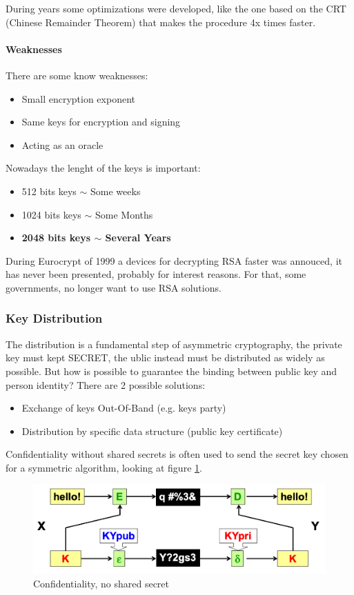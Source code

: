 \documentclass[12pt]{article}
\begin{document}
During years some optimizations were developed, like the one based on the CRT (Chinese Remainder Theorem) that makes the procedure 4x times faster.

\paragraph{Weaknesses} There are some know weaknesses:
\begin{itemize}
  \item Small encryption exponent
  \item Same keys for encryption and signing
  \item Acting as an oracle
\end{itemize}
Nowadays the lenght of the keys is important:
\begin{itemize}
  \item 512 bits keys $\sim$ Some weeks
  \item 1024 bits keys $\sim$ Some Months
  \item \textbf{2048 bits keys $\sim$ Several Years}
\end{itemize}

During Eurocrypt of 1999 a devices for decrypting RSA faster was annouced, it has never been presented, probably for interest reasons. For that, some governments, no longer want to use RSA solutions.\\

\subsubsection{Key Distribution}
The distribution is a fundamental step of asymmetric cryptography, the private key must kept SECRET, the ublic instead must be distributed as widely as possible. But how is possible to guarantee the binding between public key and person identity? There are 2 possible solutions:
\begin{itemize}
  \item Exchange of keys Out-Of-Band (e.g. keys party)
  \item Distribution by specific data structure (public key certificate)
\end{itemize}

Confidentiality without shared secrets is often used to send the secret key chosen for a symmetric algorithm, looking at figure \ref{fig:no_share}.
\begin{figure}[H]
   \centering
   \includegraphics[width=\linewidth]{images/no_share.png}
   \caption{Confidentiality, no shared secret}
   \label{fig:no_share}
\end{figure}
\end{document}
